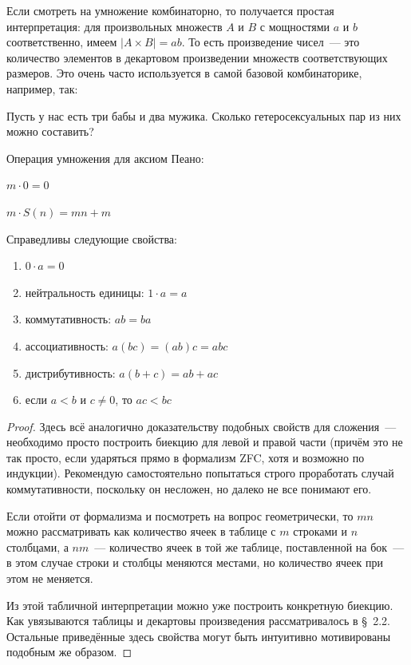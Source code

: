 Если смотреть на умножение комбинаторно, то получается простая интерпретация: для произвольных множеств $A$ и $B$ с мощностями $a$ и $b$ соответственно, имеем $|A\times B| = ab$. То есть произведение чисел~— это количество элементов в декартовом произведении множеств соответствующих размеров. Это очень часто используется в самой базовой комбинаторике, например, так:

\begin{exercise}
Пусть у нас есть три бабы и два мужика. Сколько гетеросексуальных пар из них можно составить?
\end{exercise}

\begin{definition}
Операция умножения для аксиом Пеано:\newline
\item $m\cdot 0 = 0$\newline
\item $m\cdot S(n) = mn + m$
\end{definition}

\begin{thm}
Справедливы следующие свойства:
\begin{enumerate}
\item $0\cdot a = 0$
\item нейтральность единицы: $1\cdot a = a$
\item коммутативность: $ab = ba$
\item ассоциативность: $a(bc) = (ab)c = abc$
\item дистрибутивность: $a(b+c) = ab + ac$
\item если $a < b$ и $c \not= 0$, то $ac < bc$
\end{enumerate}
\end{thm}
\begin{proof}
Здесь всё аналогично доказательству подобных свойств для сложения~— необходимо просто построить биекцию для левой и правой части (причём это не так просто, если ударяться прямо в формализм ZFC, хотя и возможно по индукции). Рекомендую самостоятельно попытаться строго проработать случай коммутативности, поскольку он несложен, но далеко не все понимают его.

Если отойти от формализма и посмотреть на вопрос геометрически, то $mn$ можно рассматривать как количество ячеек в таблице с $m$ строками и $n$ столбцами, а $nm$~— количество ячеек в той же таблице, поставленной на бок~— в этом случае строки и столбцы меняются местами, но количество ячеек при этом не меняется.

Из этой табличной интерпретации можно уже построить конкретную биекцию. Как увязываются таблицы и декартовы произведения рассматривалось в \S~2.2. Остальные приведённые здесь свойства могут быть интуитивно мотивированы подобным же образом.
\end{proof}

